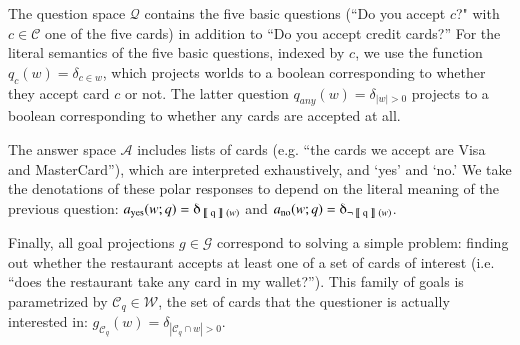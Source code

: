 \documentclass[12pt, floatsintext, jou]{apa6}
\newcommand{\den}[2][]{
\(
\left\llbracket\;\text{#2}\;\right\rrbracket^{#1}
\)
}
\begin{document}
The question space $\mathcal{Q}$ contains the five basic questions (``Do you accept $c$?" with $c \in \mathcal{C}$ one of the five cards) in addition to ``Do you accept credit cards?'' For the literal semantics of the five basic questions, indexed by $c$, we use the function $q_c(w) = \delta_{c \in w}$, which projects worlds to a boolean corresponding to whether they accept card $c$ or not.
The latter question $q_{any}(w)  = \delta_{|w| > 0}$ projects to a boolean corresponding to whether any cards are accepted at all. %

The answer space $\mathcal{A}$ includes lists of cards (e.g. ``the cards we accept are Visa and MasterCard''), which are interpreted exhaustively, and  `yes' and `no.' We take the denotations of these polar responses to depend on the literal meaning of the previous question: $a_{\text{yes}}(w;q) = \delta_{\textrm{\den{q}}(w)}$ and $a_{\text{no}}(w;q) = \delta_{\neg \textrm{\den{q}}(w)}$.

Finally, all goal projections $g \in \mathcal{G}$ correspond to solving a simple problem: finding out whether the restaurant accepts at least one of a set of cards of interest (i.e. ``does the restaurant take any card in my wallet?''). This family of goals is parametrized by $\mathcal{C}_q \in \mathcal{W}$, the set of cards that the questioner is actually interested in: 
$g_{\mathcal{C}_q}(w) = \delta_{|\mathcal{C}_q \cap w | > 0}$.
\end{document}
